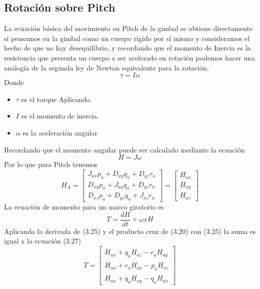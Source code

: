 \subsection{Rotación sobre Pitch}
La ecuación básica del movimiento en Pitch de la gimbal se obtiene directamente si pensamos en la gimbal como un cuerpo rígido por sí mismo y consideramos el hecho de que no
hay desequilibrio, y recordando que el momento de Inercia es la resistencia que presenta un cuerpo a ser acelerado en rotación podemos hacer una analogía de la segunda
ley de Newton equivalente para la rotación.
\begin{equation}
	\tau = I\alpha
\end{equation}
Donde
\begin{itemize}
	\item $\tau$ es el torque Aplicando.
	\item $I$ es el momento de inercia.
	\item $\alpha$ es la aceleración angular
\end{itemize}
Recordando que el momento angular puede ser calculado mediante la ecuación
\begin{equation}
	H=J\omega
\end{equation}
Por lo que para Pitch tenemos
\begin{equation}
	H_A=
	\begin{bmatrix}
		J_{ax}p_a + D_{xy}q_a + D_{yz}r_a \\
		D_{xy}p_a + J_{ay}q_a + D_{yz}r_a \\
		D_{xz}p_a + D_{yz}q_a + J_{az}r_a
	\end{bmatrix}
	=
	\begin{bmatrix}
		H_{ax} \\
		H_{ay} \\
		H_{az}
	\end{bmatrix}
\end{equation}
La ecuación de momento para un marco giratorio es
\begin{equation}
	T = \frac{dH}{dt} + \omega x H
\end{equation}
Aplicando la derivada de (3.25) y el producto cruz de (3.20) con (3.25) la suma es igual
a la ecuación (3.27)
\begin{equation}
	T =
	\begin{bmatrix}
		\dot{H}_{ax} + q_aH_{az} - r_aH_{ay} \\
		\dot{H}_{ax} + r_aH_{ax} - p_aH_{az} \\
		\dot{H}_{ax} + q_aH_{ay} - q_aH_{ax}
	\end{bmatrix}
\end{equation}

